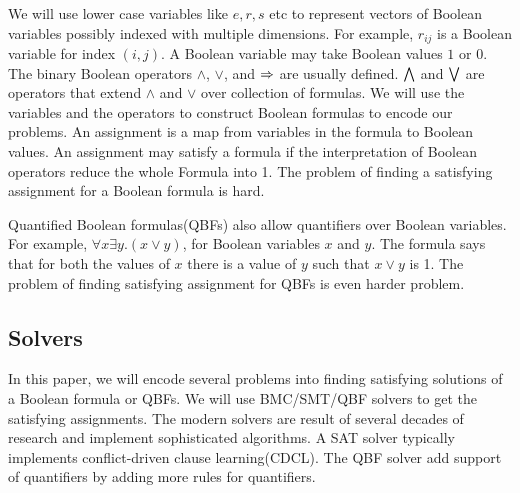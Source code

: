 We will use lower case variables like $e,r,s$ etc to represent vectors of Boolean variables
possibly indexed with multiple dimensions.
%
For example, $r_{ij}$ is a Boolean variable for index $(i,j)$.
%
%
A Boolean variable may take Boolean values $1$ or $0$.
%
The binary Boolean operators $\land$, $\lor$, and $\Rightarrow$ are usually defined.
%
$\bigwedge$ and $\bigvee$ are operators that extend $\land$ and $\lor$ over
collection of formulas.
%
We will use the variables and the operators to construct Boolean formulas to
encode our problems.
%
An assignment is a map from variables in the formula to Boolean values.
%
An assignment may satisfy a formula if the interpretation of Boolean operators
reduce the whole Formula into 1.
%
The problem of finding a satisfying assignment for a Boolean formula is
hard.
%

Quantified Boolean formulas(QBFs) also allow quantifiers over Boolean variables.
%
For example, $\forall x \exists y. (x \lor y)$, for Boolean variables $x$ and $y$.
%
The formula says that for both the values of $x$ there is a value of $y$
such that $x \lor y$ is 1.
%
The problem of finding satisfying assignment for QBFs is even harder problem.
%


\subsection{Solvers}
In this paper, we will encode several problems into finding satisfying
solutions of a Boolean formula or QBFs.
%
We will use BMC/SMT/QBF solvers to get the satisfying assignments.
%
The modern solvers are result of several decades of research
and implement sophisticated algorithms.
%
A SAT solver typically implements conflict-driven clause learning(CDCL).
%
The QBF solver add support of quantifiers by adding more rules for
quantifiers.

%
%

